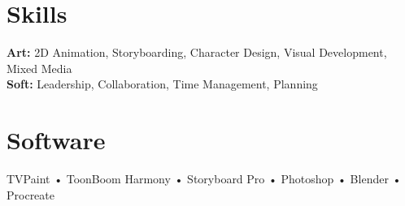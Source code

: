 \section{Skills}

\textbf{Art:} 2D Animation, Storyboarding, Character Design, Visual Development, Mixed Media \\ 
\textbf{Soft:} Leadership, Collaboration, Time Management, Planning

\section{Software}

TVPaint • ToonBoom Harmony • Storyboard Pro • Photoshop • Blender • Procreate


